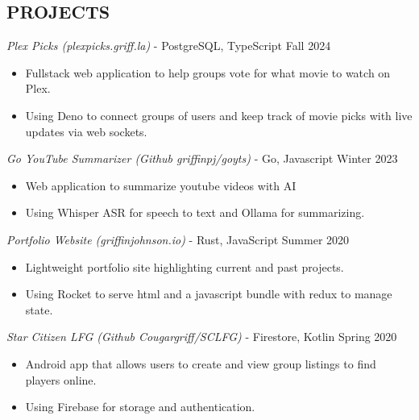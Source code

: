 \documentclass[margin]{res}
\begin{document}
\begin{resume}
\section{PROJECTS} 
    {\sl Plex Picks (plexpicks.griff.la)} - PostgreSQL, TypeScript \hfill            Fall 2024
    \begin{itemize}  \itemsep -2pt %
        \item Fullstack web application to help groups vote for what movie to watch on Plex.
        \item Using Deno to connect groups of users and keep track of movie picks with live updates via web sockets.
    \end{itemize}
        
    {\sl Go YouTube Summarizer (Github griffinpj/goyts)} - Go, Javascript \hfill            Winter 2023
    \begin{itemize}  \itemsep -2pt %
        \item Web application to summarize youtube videos with AI
        \item Using Whisper ASR for speech to text and Ollama for summarizing.
    \end{itemize}

    {\sl Portfolio Website (griffinjohnson.io)} - Rust, JavaScript \hfill            Summer 2020
    \begin{itemize}  \itemsep -2pt %
        \item Lightweight portfolio site highlighting current and past projects.
        \item Using Rocket to serve html and a javascript bundle with redux to manage state.
    \end{itemize}
    
    {\sl Star Citizen LFG (Github Cougargriff/SCLFG)} - Firestore, Kotlin  \hfill            Spring 2020
    \begin{itemize}  \itemsep -2pt %
        \item Android app that allows users to create and view group listings to find players online.
        \item Using Firebase for storage and authentication.

    \end{itemize}
				


\end{resume}
\end{document}
